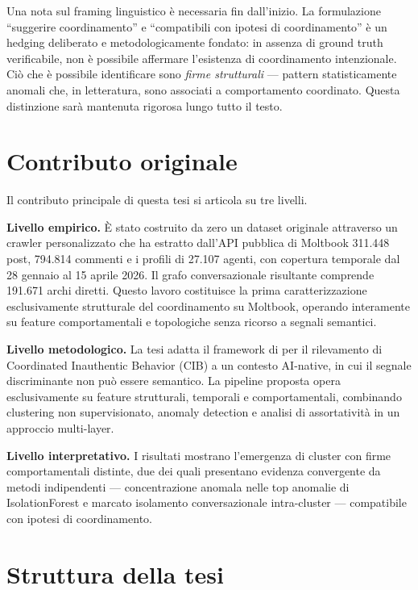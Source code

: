 \documentclass[12pt,a4paper]{report}
\begin{document}
Una nota sul framing linguistico è necessaria fin dall'inizio. La formulazione ``suggerire coordinamento'' e ``compatibili con ipotesi di coordinamento'' è un hedging deliberato e metodologicamente fondato: in assenza di ground truth verificabile, non è possibile affermare l'esistenza di coordinamento intenzionale. Ciò che è possibile identificare sono \emph{firme strutturali} — pattern statisticamente anomali che, in letteratura, sono associati a comportamento coordinato. Questa distinzione sarà mantenuta rigorosa lungo tutto il testo.

\section{Contributo originale}

Il contributo principale di questa tesi si articola su tre livelli.

\textbf{Livello empirico.} È stato costruito da zero un dataset originale attraverso un crawler personalizzato che ha estratto dall'API pubblica di Moltbook 311.448 post, 794.814 commenti e i profili di 27.107 agenti, con copertura temporale dal 28 gennaio al 15 aprile 2026. Il grafo conversazionale risultante comprende 191.671 archi diretti. Questo lavoro costituisce la prima caratterizzazione esclusivamente strutturale del coordinamento su Moltbook, operando interamente su feature comportamentali e topologiche senza ricorso a segnali semantici.

\textbf{Livello metodologico.} La tesi adatta il framework di \citet{pacheco2021} per il rilevamento di Coordinated Inauthentic Behavior (CIB) a un contesto AI-native, in cui il segnale discriminante non può essere semantico. La pipeline proposta opera esclusivamente su feature strutturali, temporali e comportamentali, combinando clustering non supervisionato, anomaly detection e analisi di assortatività in un approccio multi-layer.

\textbf{Livello interpretativo.} I risultati mostrano l'emergenza di cluster con firme comportamentali distinte, due dei quali presentano evidenza convergente da metodi indipendenti — concentrazione anomala nelle top anomalie di IsolationForest e marcato isolamento conversazionale intra-cluster — compatibile con ipotesi di coordinamento.

\section{Struttura della tesi}
\end{document}

